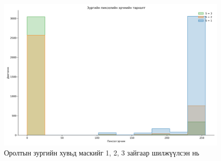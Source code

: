 \documentclass[a4paper]{article}
\begin{document}
\begin{figure}[H]
  \centering
  \includegraphics[scale = 0.30]{img_strides_hist.png}
  \caption[Intensity 1]{Оролтын зургийн хувьд маскийг 1, 2, 3 зайгаар шилжүүлсэн нь}
\end{figure}
\end{document}
